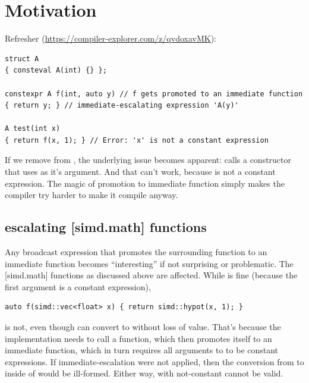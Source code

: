 \pagestyle{scrheadings}




\section{Motivation}
Refresher (\url{https://compiler-explorer.com/z/qvdoxavMK}):
\medskip\begin{lstlisting}[style=Vc]
struct A
{ consteval A(int) {} };

constexpr A f(int, auto y) // f gets promoted to an immediate function
{ return y; } // immediate-escalating expression 'A(y)'

A test(int x)
{ return f(x, 1); } // Error: 'x' is not a constant expression
\end{lstlisting}

If we remove  from , the underlying
issue becomes apparent:
 calls a  constructor that uses  as it's argument.
And that can't work, because  is not a constant expression.
The magic of promotion to immediate function simply makes the compiler try harder to make it compile
anyway.

\subsection{escalating [simd.math] functions}

Any  broadcast expression that promotes the surrounding function to an immediate
function becomes “interesting” if not surprising or problematic.
The [simd.math] functions as discussed above are affected.
While  is fine (because the first argument is a constant
expression),
\medskip\begin{lstlisting}[style=Vc]
auto f(simd::vec<float> x) { return simd::hypot(x, 1); }
\end{lstlisting}
is not, even though  can convert to  without loss of value.
That's because the  implementation needs to call a  function, which then
promotes  itself to an immediate function, which in turn requires all arguments to
 to be constant expressions.
If immediate-escalation were not applied, then the conversion from  to
 inside of  would be ill-formed.
Either way,  with not-constant  cannot be valid.

